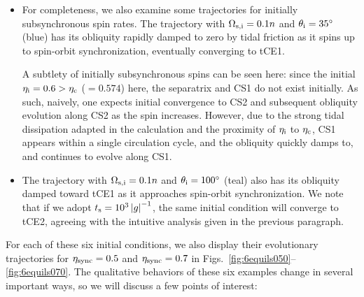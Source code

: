 \documentclass[
        fleqn,
        usenatbib,
        referee
    ]{mnras}
\newcommand*{\abs}[1]{\left|#1\right|}
\begin{document}
\begin{itemize}
    \item For completeness, we also examine some trajectories for initially
        subsynchronous spin rates. The trajectory with $\Omega_{\rm s, i} =
        0.1n$ and $\theta_{\rm i} = 35^\circ$ (blue) has its obliquity rapidly
        damped to zero by tidal friction as it spins up to spin-orbit
        synchronization, eventually converging to tCE1.

        A subtlety of initially subsynchronous spins can be seen here: since the
        initial $\eta_{\rm i} = 0.6 > \eta_{\rm c}$ ($= 0.574$) here, the
        separatrix and CS1 do not exist initially. As such, naively, one expects
        initial convergence to CS2 and subsequent obliquity evolution along CS2
        as the spin increases. However, due to the strong tidal dissipation
        adapted in the calculation and the proximity of $\eta_{\rm i}$ to
        $\eta_{\rm c}$, CS1 appears within a single circulation cycle, and the
        obliquity quickly damps to, and continues to evolve along CS1.

    \item The trajectory with $\Omega_{\rm s, i} = 0.1n$ and $\theta_{\rm i} =
        100^\circ$ (teal) also has its obliquity damped toward tCE1 as it
        approaches spin-orbit synchronization. We note that if we adopt $t_{\rm
        s} = 10^3\abs{g}^{-1}$, the same initial condition will converge to
        tCE2, agreeing with the intuitive analysis given in the previous
        paragraph.
\end{itemize}
For each of these six initial conditions, we also display their evolutionary
trajectories for $\eta_{\rm sync} = 0.5$ and $\eta_{\rm sync} = 0.7$ in
Figs.~\ref{fig:6equils050}--\ref{fig:6equils070}. The qualitative behaviors of
these six examples change in several important ways, so we will discuss a few
points of interest:
\end{document}
